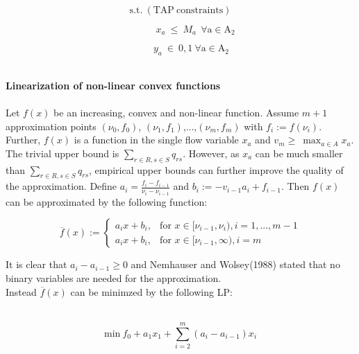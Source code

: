 \documentclass[a4paper, 12pt]{article}
\begin{document}
\indent\boldmath\begin{large}
\begin{equation*}
\mathrm{s.t.}\ \mathrm{\left(TAP\ constraints\right)}
\end{equation*}
\end{large}
\begin{large}
\boldmath\begin{equation*}
\ \ \ \ \ \ \ \ \ \ \ \ \ \ x_{a}\ \leq\ M_{a}\ \ \mathrm{\forall{a}\in{A_{2}}}
\end{equation*}
\end{large}
\begin{large}
\boldmath\begin{equation*}
\ \ \ \ \ \ \ \ \ \ y_{a}\ \in\ {0,1}\ \mathrm{\forall{a}\in{A_{2}}}
\end{equation*}
\end{large} \\
\textbf{Linearization of non-linear convex functions}\\~\\
Let $f\left(x\right)$ be an increasing, convex and non-linear function. Assume $m+1$ approximation points $\left(\nu_{0},f_{0}\right)$, $\left(\nu_{1},f_{1}\right)$,...,$\left(\nu_{m},f_{m}\right)$ with $f_{i}:=f\left(\nu_{i}\right)$. Further, $f\left(x\right)$ is a function in the single flow variable $x_{a}$ and $v_{m}\geq\ \max_{a\in{A}}{x_{a}}$. The trivial upper bound is $\sum_{r\in{R},s\in{S}} q_{rs}$. However, as $x_{a}$ can be much smaller than $\sum_{r\in{R},s\in{S}} q_{rs}$, empirical upper bounds can further improve the quality of the approximation. Define $a_{i}=\frac{f_{i}-f_{i-1}}{\nu_{i}-\nu_{i-1}}$ and $b_{i}:=-v_{i-1}a_{i}+f_{i-1}$. Then $f\left(x\right)$ can be approximated by the following function:
\begin{large}
\[
 \overline{f}(x) := 
  \begin{cases} 
   a_{i}x+b_{i}, & \text{for }  x \in{[\nu_{i-1},\nu_{i})},i=1,...,m-1  \\
   a_{i}x+b_{i}, & \text{for }  x \in{[\nu_{i-1},\infty)},i=m
  \end{cases}
\]
\end{large}
It is clear that $a_{i}-a_{i-1}\geq0$ and Nemhauser and Wolsey(1988) stated that no binary variables are needed for the approximation.\\
Instead $\overline{f}(x)$ can be minimzed by the following LP:\\~\\
\begin{large}
\begin{equation*}
\mathrm{min}\ f_{0}+a_{1}x_{1}+\sum_{i=2}^m\left(a_{i}-a_{i-1}\right)x_{i}
\end{equation*}
\end{large}
\end{document}
